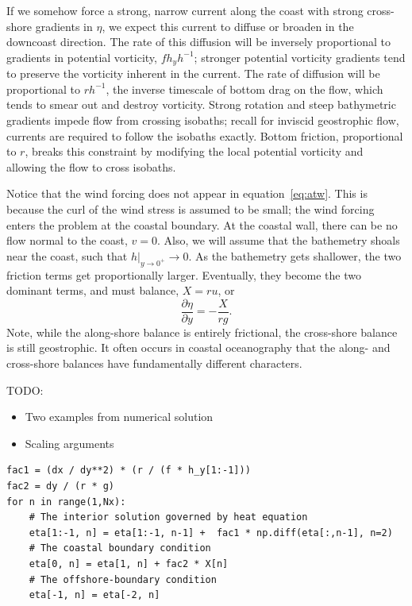 \documentclass[11pt]{report}
\numberwithin{equation}{section}
\begin{document}
If we somehow force a strong, narrow current along the coast with strong cross-shore gradients in $\eta$, we expect this current to diffuse or broaden in the downcoast direction.  The rate of this diffusion will be inversely proportional to gradients in potential vorticity, $f h_y h^{-1}$; stronger potential vorticity gradients tend to preserve the vorticity inherent in the current.  The rate of diffusion will be proportional to $r h^{-1}$, the inverse timescale of bottom drag on the flow, which tends to smear out and destroy vorticity.  Strong rotation and steep bathymetric gradients impede flow from crossing isobaths; recall for inviscid geostrophic flow, currents are required to follow the isobaths exactly.  Bottom friction, proportional to $r$, breaks this constraint by modifying the local potential vorticity and allowing the flow to cross isobaths.

Notice that the wind forcing does not appear in equation~\ref{eq:atw}.  This is because the curl of the wind stress is assumed to be small; the wind forcing enters the problem at the coastal boundary.  At the coastal wall, there can be no flow normal to the coast, $v=0$.  Also, we will assume that the bathemetry shoals near the coast, such that $h|_{y\rightarrow 0^+} \rightarrow 0$.  As the bathemetry gets shallower, the two friction terms get proportionally larger.  Eventually, they become the two dominant terms, and must balance, $X = ru$, or
\begin{equation}
    \frac{\partial \eta}{\partial y} = -\frac{X}{r g} .
\end{equation}
Note, while the along-shore balance is entirely frictional, the cross-shore balance is still geostrophic.  It often occurs in coastal oceanography that the along- and cross-shore balances have fundamentally different characters.

TODO:
\begin{itemize}
    \item Two examples from numerical solution
    \item Scaling arguments
\end{itemize}


\begin{lstlisting}[float=tp,
                   caption={Arrested topographic wave numerical solution kernel.  See {\tt atw.py} for the full code.},
                   label=lst:atw]
fac1 = (dx / dy**2) * (r / (f * h_y[1:-1]))
fac2 = dy / (r * g)
for n in range(1,Nx):
    # The interior solution governed by heat equation
    eta[1:-1, n] = eta[1:-1, n-1] +  fac1 * np.diff(eta[:,n-1], n=2)
    # The coastal boundary condition
    eta[0, n] = eta[1, n] + fac2 * X[n]
    # The offshore-boundary condition
    eta[-1, n] = eta[-2, n]
\end{lstlisting}
\end{document}
